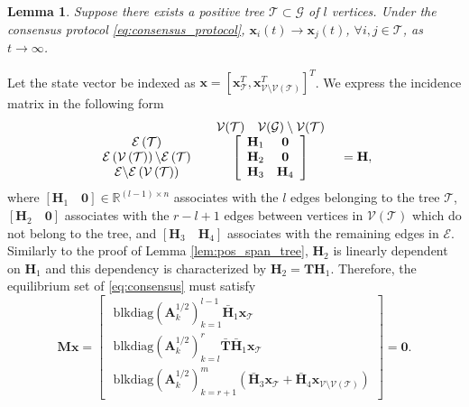 \documentclass[draftclsnofoot,11pt,onecolumn]{IEEEtran}
\newtheorem{Lemma}{Lemma}
\newcommand{\m}[1]{\mathbf{#1}}
\newcommand{\mc}[1]{\mathcal{#1}}
\newcommand{\mb}[1]{\mathbb{#1}}
\begin{document}
\begin{Lemma} \label{lem:pos_tree}
Suppose there exists a positive tree $\mc{T} \subset \mc{G}$ of $l$ vertices. Under the consensus protocol \ref{eq:consensus_protocol}, $\m{x}_i(t) \to \m{x}_j(t)$, $\forall i, j \in \mc{T}$, as $t \to \infty$.
\end{Lemma}

\begin{IEEEproof}
Let the state vector be indexed as $\m{x} = [\m{x}_{\mc{T}}^T, \m{x}_{\mc{V}\setminus \mc{V}(\mc{T})}^T]^T$. We express the incidence matrix in the following form
\[\begin{array}{*{20}{c}}
{}&\begin{array}{*{20}{c}}
{\mc{V}(\mc{T})}&{\rm{   }}\mc{V}(\mc{G}) \setminus \mc{V}(\mc{T}) 
\end{array}\\
{\begin{array}{*{20}{c}}
{{\cal E}\left( {\cal T} \right)}\\
{{\cal E}\left( {{\cal V}\left( {\cal T} \right)} \right)\backslash {\cal E}\left( {\cal T} \right)}\\
{{\cal E}\backslash {\cal E}\left( {{\cal V}\left( {\cal T} \right)} \right)}
\end{array}}&{\left[ {\begin{array}{*{20}{c}}
{{\rm{     }}{\m{H}_1}{\rm{    }}}& {{\rm{        }}\m{0}{\rm{        }}}\\
{{\rm{  }}{\m{H}_2}}& {{\rm{ }} \m{0} {\rm{ }}}\\
{{\rm{  }}{\m{H}_3}}& {{\rm{     }}{\m{H}_4}{\rm{  }}}
\end{array}} \right]}
\end{array}\begin{array}{*{20}{c}}
{}\\
{}\\
{ = \m{H}},\\
{}
\end{array}\]
where $[\m{H}_{1} \quad \m{0}] \in \mb{R}^{(l-1)\times n}$ associates with the $l$ edges belonging to the tree $\mc{T}$, $[\m{H}_{2} \quad \m{0}]$ associates with the $r-l+1 $ edges between vertices in $\mc{V}(\mc{T})$ which do not belong to the tree, and $[\m{H}_3 \quad \m{H}_4]$ associates with the remaining edges in $\mc{E}$. Similarly to the proof of Lemma \ref{lem:pos_span_tree}, $\m{H}_2$ is linearly dependent on $\m{H}_1$ and this dependency is characterized by $\m{H}_2 = \m{T} \m{H}_1$. Therefore, the equilibrium set of \eqref{eq:consensus} must satisfy
\begin{equation}
\m{M}\m{x} = \begin{bmatrix}
\text{ blkdiag}(\m{A}_k^{{1}/{2}})_{k=1}^{l-1} \bar{\m{H}}_{1} \m{x}_{\mc{T}} \\
\text{ blkdiag}(\m{A}_k^{{1}/{2}})_{k=l}^{r} \bar{\m{T}} \bar{\m{H}}_{1} \m{x}_{\mc{T}} \\
\text{ blkdiag}(\m{A}_k^{{1}/{2}})_{k=r+1}^{m} (\bar{\m{H}}_3 \m{x}_{\mc{T}} + \bar{\m{H}}_4 \m{x}_{\mc{V}\setminus \mc{V}(\mc{T})})
\end{bmatrix} = \m{0}.
\end{equation}


\end{IEEEproof}
\end{document}
